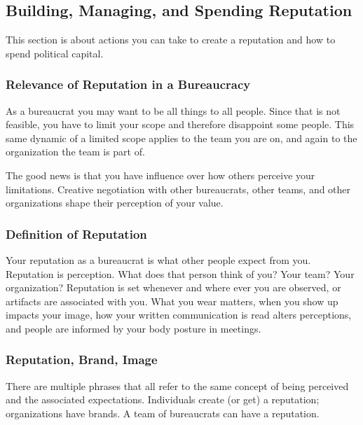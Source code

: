 \subsection{Building, Managing, and Spending Reputation\label{sec:reputation}}




This section is about actions you can take to create a reputation and how to spend political capital. 

\subsubsection{Relevance of Reputation in a Bureaucracy}

As a bureaucrat you may want to be all things to all people. Since that is not feasible, you have to limit your scope and therefore disappoint some people. This same dynamic of a limited scope applies to the team you are on, and again to the organization the team is part of.

The good news is that you have influence over how others perceive your limitations. Creative negotiation with other bureaucrats, other teams, and other organizations shape their perception of your value. 

\subsubsection{Definition of Reputation}

Your reputation as a bureaucrat is what other people expect from you. Reputation is perception. What does that person think of you? Your team? Your organization? 
Reputation is set whenever and where ever you are observed, or artifacts are associated with you. 
What you wear matters, when you show up impacts your image, how your written communication is read alters perceptions, and people are informed by your body posture in meetings. 

\subsubsection{Reputation, Brand, Image}

There are multiple phrases that all refer to the same concept of being perceived and the associated expectations. Individuals create (or get) a reputation; organizations have brands. A team of bureaucrats can have a reputation. 

